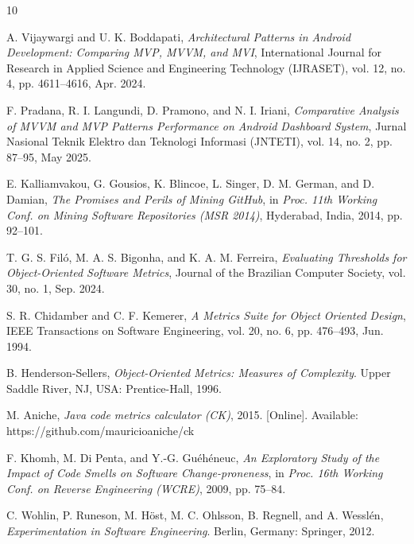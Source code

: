 \documentclass[conference]{IEEEtran}
\begin{document}
\begin{thebibliography}{10}

A. Vijaywargi and U. K. Boddapati,
\emph{Architectural Patterns in Android Development: Comparing MVP, MVVM, and MVI},
International Journal for Research in Applied Science and Engineering
Technology (IJRASET), vol. 12, no. 4, pp. 4611--4616, Apr. 2024.

F. Pradana, R. I. Langundi, D. Pramono, and N. I. Iriani,
\emph{Comparative Analysis of MVVM and MVP Patterns Performance on Android
Dashboard System},
Jurnal Nasional Teknik Elektro dan Teknologi Informasi (JNTETI),
vol. 14, no. 2, pp. 87--95, May 2025.

E. Kalliamvakou, G. Gousios, K. Blincoe, L. Singer, D. M. German,
and D. Damian,
\emph{The Promises and Perils of Mining GitHub},
in \textit{Proc. 11th Working Conf. on Mining Software Repositories
(MSR 2014)}, Hyderabad, India, 2014, pp. 92--101.

T. G. S. Fil\'{o}, M. A. S. Bigonha, and K. A. M. Ferreira,
\emph{Evaluating Thresholds for Object-Oriented Software Metrics},
Journal of the Brazilian Computer Society,
vol. 30, no. 1, Sep. 2024.

S. R. Chidamber and C. F. Kemerer,
\emph{A Metrics Suite for Object Oriented Design},
IEEE Transactions on Software Engineering, vol. 20, no. 6, pp. 476--493, Jun. 1994.

B. Henderson-Sellers,
\emph{Object-Oriented Metrics: Measures of Complexity}.
Upper Saddle River, NJ, USA: Prentice-Hall, 1996.

M. Aniche,
\emph{Java code metrics calculator (CK)}, 2015. [Online]. Available:
https://github.com/mauricioaniche/ck

F. Khomh, M. Di Penta, and Y.-G. Gu\'eh\'eneuc,
\emph{An Exploratory Study of the Impact of Code Smells on Software
Change-proneness},
in \textit{Proc. 16th Working Conf. on Reverse Engineering (WCRE)}, 2009,
pp. 75--84.

C. Wohlin, P. Runeson, M. H\"ost, M. C. Ohlsson, B. Regnell, and A. Wessl\'en,
\emph{Experimentation in Software Engineering}.
Berlin, Germany: Springer, 2012.

\end{thebibliography}
\end{document}
